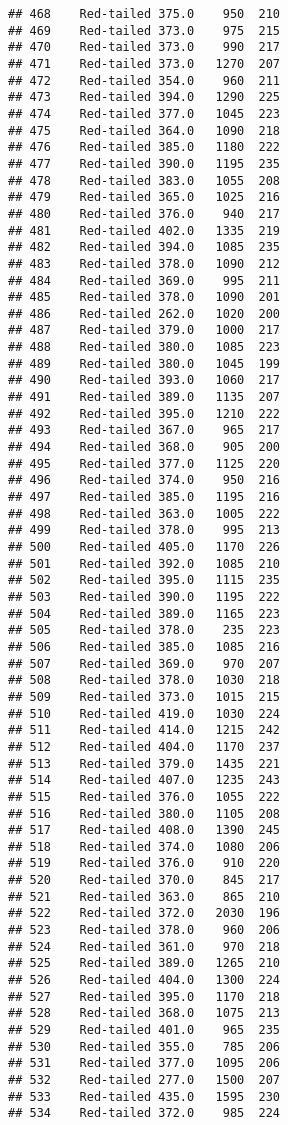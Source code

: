 \documentclass[
]{article}
\begin{document}
\begin{verbatim}
## 468    Red-tailed 375.0    950  210
## 469    Red-tailed 373.0    975  215
## 470    Red-tailed 373.0    990  217
## 471    Red-tailed 373.0   1270  207
## 472    Red-tailed 354.0    960  211
## 473    Red-tailed 394.0   1290  225
## 474    Red-tailed 377.0   1045  223
## 475    Red-tailed 364.0   1090  218
## 476    Red-tailed 385.0   1180  222
## 477    Red-tailed 390.0   1195  235
## 478    Red-tailed 383.0   1055  208
## 479    Red-tailed 365.0   1025  216
## 480    Red-tailed 376.0    940  217
## 481    Red-tailed 402.0   1335  219
## 482    Red-tailed 394.0   1085  235
## 483    Red-tailed 378.0   1090  212
## 484    Red-tailed 369.0    995  211
## 485    Red-tailed 378.0   1090  201
## 486    Red-tailed 262.0   1020  200
## 487    Red-tailed 379.0   1000  217
## 488    Red-tailed 380.0   1085  223
## 489    Red-tailed 380.0   1045  199
## 490    Red-tailed 393.0   1060  217
## 491    Red-tailed 389.0   1135  207
## 492    Red-tailed 395.0   1210  222
## 493    Red-tailed 367.0    965  217
## 494    Red-tailed 368.0    905  200
## 495    Red-tailed 377.0   1125  220
## 496    Red-tailed 374.0    950  216
## 497    Red-tailed 385.0   1195  216
## 498    Red-tailed 363.0   1005  222
## 499    Red-tailed 378.0    995  213
## 500    Red-tailed 405.0   1170  226
## 501    Red-tailed 392.0   1085  210
## 502    Red-tailed 395.0   1115  235
## 503    Red-tailed 390.0   1195  222
## 504    Red-tailed 389.0   1165  223
## 505    Red-tailed 378.0    235  223
## 506    Red-tailed 385.0   1085  216
## 507    Red-tailed 369.0    970  207
## 508    Red-tailed 378.0   1030  218
## 509    Red-tailed 373.0   1015  215
## 510    Red-tailed 419.0   1030  224
## 511    Red-tailed 414.0   1215  242
## 512    Red-tailed 404.0   1170  237
## 513    Red-tailed 379.0   1435  221
## 514    Red-tailed 407.0   1235  243
## 515    Red-tailed 376.0   1055  222
## 516    Red-tailed 380.0   1105  208
## 517    Red-tailed 408.0   1390  245
## 518    Red-tailed 374.0   1080  206
## 519    Red-tailed 376.0    910  220
## 520    Red-tailed 370.0    845  217
## 521    Red-tailed 363.0    865  210
## 522    Red-tailed 372.0   2030  196
## 523    Red-tailed 378.0    960  206
## 524    Red-tailed 361.0    970  218
## 525    Red-tailed 389.0   1265  210
## 526    Red-tailed 404.0   1300  224
## 527    Red-tailed 395.0   1170  218
## 528    Red-tailed 368.0   1075  213
## 529    Red-tailed 401.0    965  235
## 530    Red-tailed 355.0    785  206
## 531    Red-tailed 377.0   1095  206
## 532    Red-tailed 277.0   1500  207
## 533    Red-tailed 435.0   1595  230
## 534    Red-tailed 372.0    985  224

\end{verbatim}
\end{document}
